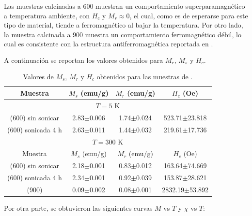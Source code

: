 \documentclass[../main.tex]{subfiles}
\begin{document}
Las muestras calcinadas a 600\gradoC{} muestran un comportamiento superparamagnético a temperatura ambiente, con $H_c$ y $M_r\approx0$, el cual, como es de esperarse para este tipo de material, tiende a ferromagnético al bajar la temperatura. Por otro lado, la muestra calcinada a 900\gradoC{} muestra un comportamiento ferromagnético débil, lo cual es consistente con la estructura antiferromagnética reportada en \cite{Wang2019}.

A continuación se reportan los valores obtenidos para $M_r$, $M_s$ y $H_c$.
\begin{table}[H]
    \centering
    \begin{tabular}{|c||c|c|c|}
        \hline 
        Muestra & $M_s$ (emu/g) & $M_r$ (emu/g) & $H_c$ (Oe) \\
        \hline
        \hline
        \multicolumn{4}{|c|}{$T=5$ K} \\
        \hline
        \neod{} (600\gradoC{}) sin sonicar & 2.83$\pm$0.006 & 1.74$\pm$0.024 & 523.71$\pm$23.818 \\
        \hline
        \neod{} (600\gradoC{}) sonicada 4 h & 2.63$\pm$0.011 & 1.44$\pm$0.032 & 219.61$\pm$17.736 \\
        \hline
        \multicolumn{4}{|c|}{$T=300$ K} \\
        \hline 
        Muestra & $M_s$ (emu/g) & $M_r$ (emu/g) & $H_c$ (Oe) \\
        \hline
        \hline
        \neod{} (600\gradoC{}) sin sonicar & 2.18$\pm$0.001 & 0.83$\pm$0.012 & 163.64$\pm$74.669 \\
        \hline
        \neod{} (600\gradoC{}) sonicada 4 h & 2.34$\pm$0.001 & 0.92$\pm$0.039 & 153.87$\pm$28.621 \\
        \hline
        \neod{} (900\gradoC{}) & 0.09$\pm$0.002 & 0.08$\pm$0.001 & 2832.19$\pm$53.892 \\
        \hline
        \end{tabular} 
    \caption{Valores de $M_s$, $M_r$ y $H_c$ obtenidos para las muestras de \neod{}.}
    \label{tabla:resmvshneod}
\end{table}
Por otra parte, se obtuvieron las siguientes curvas $M$ vs $T$ y $\chi$ vs $T$:
\end{document}
